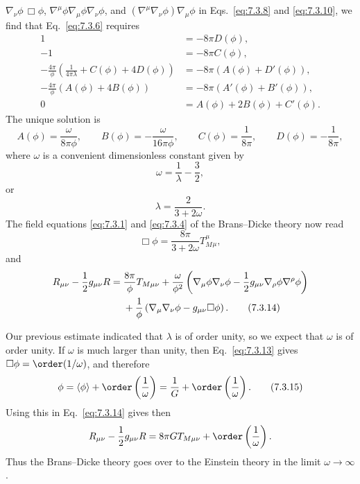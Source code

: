 \(\nabla_\nu\phi\,\Box\phi\),
\(\nabla^\mu\phi\nabla_\mu\phi\nabla_\nu\phi\), and
\((\nabla^\mu\nabla_\nu\phi)\nabla_\mu\phi\) in
Eqs.~\eqref{eq:7.3.8} and \eqref{eq:7.3.10}, we find that
Eq.~\eqref{eq:7.3.6} requires
\begin{align*}
  1&=-8\pi D(\phi),\\
  -1&=-8\pi C(\phi),\\
  -\frac{4\pi}{\phi}
  \left(\frac{1}{4\pi\lambda}+C(\phi)+4D(\phi)\right)
  &=-8\pi\left(A(\phi)+D'(\phi)\right),\\
  -\frac{4\pi}{\phi}\left(A(\phi)+4B(\phi)\right)
  &=-8\pi\left(A'(\phi)+B'(\phi)\right),\\
  0&=A(\phi)+2B(\phi)+C'(\phi).
\end{align*}
The unique solution is
\begin{equation}
  A(\phi)=\frac{\omega}{8\pi\phi},
  \qquad
  B(\phi)=-\frac{\omega}{16\pi\phi},
  \qquad
  C(\phi)=\frac1{8\pi},
  \qquad
  D(\phi)=-\frac1{8\pi},
  \tag{7.3.11}\label{eq:7.3.11}
\end{equation}
where \(\omega\) is a convenient dimensionless constant given by
\[
  \omega=\frac1\lambda-\frac32,
\]
or
\begin{equation}
  \lambda=\frac{2}{3+2\omega}.
  \tag{7.3.12}\label{eq:7.3.12}
\end{equation}
The field equations \eqref{eq:7.3.1} and \eqref{eq:7.3.4} of the
Brans--Dicke theory now read
\begin{equation}
  \Box\phi
  =
  \frac{8\pi}{3+2\omega}T_M^\mu{}_\mu,
  \tag{7.3.13}\label{eq:7.3.13}
\end{equation}
and
\begin{align}
  R_{\mu\nu}-\frac12g_{\mu\nu}R
  ={}&
  \frac{8\pi}{\phi}T_{M\mu\nu}
  +\frac{\omega}{\phi^2}
  \left(
    \nabla_\mu\phi\nabla_\nu\phi
    -\frac12g_{\mu\nu}\nabla_\rho\phi\nabla^\rho\phi
  \right)
  \notag\\
  &+
  \frac1\phi
  \left(
    \nabla_\mu\nabla_\nu\phi-g_{\mu\nu}\Box\phi
  \right).
  \tag{7.3.14}\label{eq:7.3.14}
\end{align}

Our previous estimate indicated that \(\lambda\) is of order unity, so we
expect that \(\omega\) is of order unity. If \(\omega\) is much larger than
unity, then Eq.~\eqref{eq:7.3.13} gives
\(\Box\phi=\order(1/\omega)\), and therefore
\begin{equation}
  \phi
  =
  \langle\phi\rangle+\order\left(\frac1\omega\right)
  =
  \frac1G+\order\left(\frac1\omega\right).
  \tag{7.3.15}\label{eq:7.3.15}
\end{equation}
Using this in Eq.~\eqref{eq:7.3.14} gives then
\[
  R_{\mu\nu}-\frac12g_{\mu\nu}R
  =
  8\pi G T_{M\mu\nu}
  +\order\left(\frac1\omega\right).
\]
Thus the Brans--Dicke theory goes over to the Einstein theory in the limit
\(\omega\to\infty\).

